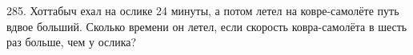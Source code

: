 285. Хоттабыч ехал на ослике 24 минуты, а потом летел на ковре-самолёте путь вдвое больший. Сколько времени он летел, если скорость ковра-самолёта в шесть раз больше, чем у ослика?\\

